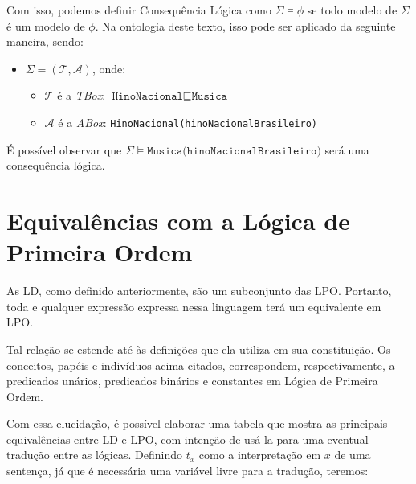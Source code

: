 Com isso, podemos definir Consequência Lógica como $ \Sigma \models \phi $ se todo modelo de $ \Sigma $ é um modelo de $ \phi $. Na ontologia deste texto, isso pode ser aplicado da seguinte maneira, sendo:

\begin{itemize}
	\item $ \Sigma = (\mathcal{T}, \mathcal{A}) $, onde:
	\begin{itemize}
		\item $ \mathcal{T} $ é a \textit{TBox}: $ \texttt{HinoNacional} \sqsubseteq \texttt{Musica} $
		\item $ \mathcal{A} $ é a \textit{ABox}: \texttt{HinoNacional(hinoNacionalBrasileiro)}
	\end{itemize}
\end{itemize}

É possível observar que $ \Sigma \models \texttt{Musica(hinoNacionalBrasileiro)} $ será uma consequência lógica.

\section{Equivalências com a Lógica de Primeira Ordem}

As LD, como definido anteriormente, são um subconjunto das LPO. Portanto, toda e qualquer expressão expressa nessa linguagem terá um equivalente em LPO. 

Tal relação se estende até às definições que ela utiliza em sua constituição. Os conceitos, papéis e indivíduos acima citados, correspondem, respectivamente, a predicados unários, predicados binários e constantes em Lógica de Primeira Ordem.

Com essa elucidação, é possível elaborar uma tabela que mostra as principais equivalências entre LD e LPO, com intenção de usá-la para uma eventual tradução entre as lógicas. Definindo $t_x$ como a interpretação em $x$ de uma sentença, já que é necessária uma variável livre para a tradução, teremos:

